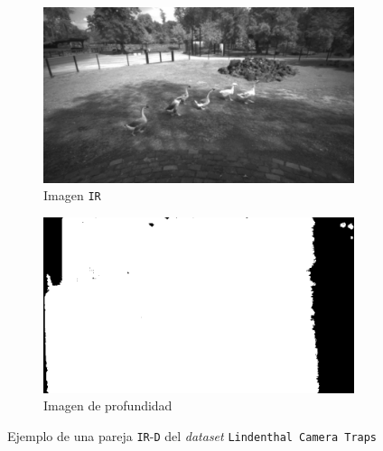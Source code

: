 \documentclass[12pt,a4paper]{report}
\begin{document}
\begin{figure}[!h]
    \centering
    \begin{subfigure}{0.45\textwidth}
        \centering
        \includegraphics[width=\textwidth]{media/data/ir_gueese.jpg}
        \caption{Imagen \texttt{IR}}
    \end{subfigure}
    \hfill
    \begin{subfigure}{0.45\textwidth}
        \centering
        \includegraphics[width=\textwidth]{media/data/depth_gueese.png}
        \caption{Imagen de profundidad}
    \end{subfigure}
    \caption{Ejemplo de una pareja \texttt{IR}-\texttt{D} del \textit{dataset} \texttt{Lindenthal Camera Traps}}
    \label{fig:base-data-lindenthal}
\end{figure}
\end{document}
